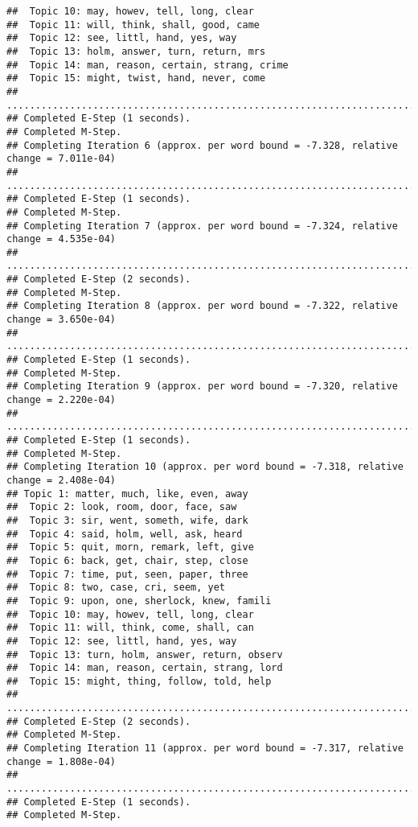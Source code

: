 \documentclass[
]{book}
\begin{document}
\begin{verbatim}
##  Topic 10: may, howev, tell, long, clear 
##  Topic 11: will, think, shall, good, came 
##  Topic 12: see, littl, hand, yes, way 
##  Topic 13: holm, answer, turn, return, mrs 
##  Topic 14: man, reason, certain, strang, crime 
##  Topic 15: might, twist, hand, never, come 
## ....................................................................................................
## Completed E-Step (1 seconds). 
## Completed M-Step. 
## Completing Iteration 6 (approx. per word bound = -7.328, relative change = 7.011e-04) 
## ....................................................................................................
## Completed E-Step (1 seconds). 
## Completed M-Step. 
## Completing Iteration 7 (approx. per word bound = -7.324, relative change = 4.535e-04) 
## ....................................................................................................
## Completed E-Step (2 seconds). 
## Completed M-Step. 
## Completing Iteration 8 (approx. per word bound = -7.322, relative change = 3.650e-04) 
## ....................................................................................................
## Completed E-Step (1 seconds). 
## Completed M-Step. 
## Completing Iteration 9 (approx. per word bound = -7.320, relative change = 2.220e-04) 
## ....................................................................................................
## Completed E-Step (1 seconds). 
## Completed M-Step. 
## Completing Iteration 10 (approx. per word bound = -7.318, relative change = 2.408e-04) 
## Topic 1: matter, much, like, even, away 
##  Topic 2: look, room, door, face, saw 
##  Topic 3: sir, went, someth, wife, dark 
##  Topic 4: said, holm, well, ask, heard 
##  Topic 5: quit, morn, remark, left, give 
##  Topic 6: back, get, chair, step, close 
##  Topic 7: time, put, seen, paper, three 
##  Topic 8: two, case, cri, seem, yet 
##  Topic 9: upon, one, sherlock, knew, famili 
##  Topic 10: may, howev, tell, long, clear 
##  Topic 11: will, think, come, shall, can 
##  Topic 12: see, littl, hand, yes, way 
##  Topic 13: turn, holm, answer, return, observ 
##  Topic 14: man, reason, certain, strang, lord 
##  Topic 15: might, thing, follow, told, help 
## ....................................................................................................
## Completed E-Step (2 seconds). 
## Completed M-Step. 
## Completing Iteration 11 (approx. per word bound = -7.317, relative change = 1.808e-04) 
## ....................................................................................................
## Completed E-Step (1 seconds). 
## Completed M-Step. 

\end{verbatim}
\end{document}
